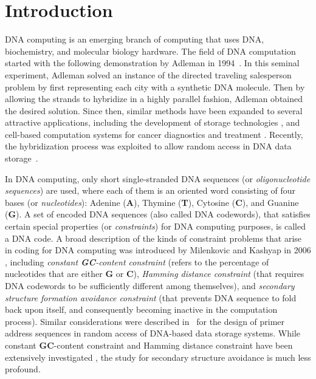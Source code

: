 \documentclass[conference]{IEEEtran}
\theoremstyle{plain}
\theoremstyle{definition}
\begin{document}
\section{Introduction}
DNA computing is an emerging branch of computing that uses DNA, biochemistry, and molecular biology hardware. 
The field of DNA computation started with the following demonstration by Adleman in 1994~\cite{adle:1994}. In this seminal experiment, Adleman solved an instance of the directed traveling salesperson problem by first representing each city with a synthetic DNA molecule. Then by allowing the strands to hybridize in a highly parallel fashion, Adleman obtained the desired solution. Since then, similar methods have been expanded to several attractive applications, including the development of storage technologies \cite{church2012,fountain2017,Organick:2018,goldman2013}, and cell-based computation systems for cancer diagnostics and treatment \cite{son:2004}. Recently, the hybridization process was exploited to allow random access in DNA data storage~\cite{yazdi:2017}.

In DNA computing, only short single-stranded DNA sequences (or {\em oligonucleotide sequences}) are used, where each of them is an oriented word consisting of four bases (or {\em nucleotides}): Adenine ({\bf A}), Thymine  ({\bf T}), Cytosine ({\bf C}), and Guanine ({\bf G}). A set of encoded DNA sequences (also called DNA codewords), that satisfies certain special properties (or {\em constraints}) for DNA computing purposes, is called a DNA code. A broad description of the kinds of constraint problems that arise in coding for DNA computing was introduced by Milenkovic and Kashyap in 2006 \cite{O2:2005}, including {\em constant {\bf G}{\bf C}-content constraint} (refers to the percentage of nucleotides that are either {\bf G} or {\bf C}), {\em Hamming distance constraint} (that requires DNA codewords to be sufficiently different among themselves), and {\em secondary structure formation avoidance constraint} (that prevents DNA sequence to fold back upon itself, and consequently becoming inactive in the computation process). 
Similar considerations were described in~\cite{yazdi:2018, chee:2020} for the design of primer address sequences in random access of DNA-based data storage systems.
While constant {\bf G}{\bf C}-content constraint and Hamming distance constraint have been extensively investigated \cite{K:2021, KDG:2021, O:2005, O2:2005, TT:2021, KING:2003, KING:2005, segmented}, the study for secondary structure avoidance is much less profound. 
\end{document}
